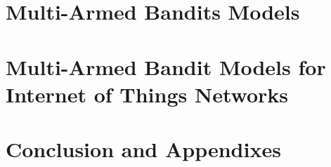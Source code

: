 \setcounter{mtc}{1}
\adjustmtc






\part{Multi-Armed Bandits Models}






\part{Multi-Armed Bandit Models for Internet of Things Networks}








\part{Conclusion and Appendixes}


